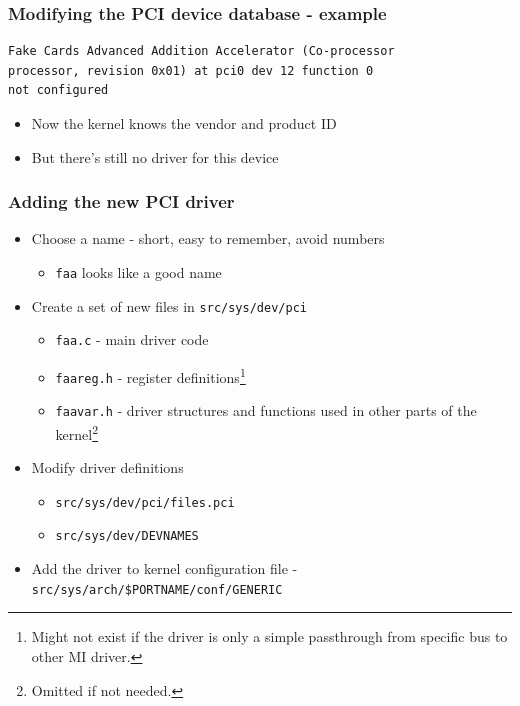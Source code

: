 \documentclass[dvipsnames,table]{beamer}
\begin{document}
\begin{frame}[fragile]
\frametitle{Modifying the PCI device database - example}
\begin{verbatim}
Fake Cards Advanced Addition Accelerator (Co-processor 
processor, revision 0x01) at pci0 dev 12 function 0 
not configured
\end{verbatim}
\begin{itemize}
	\item Now the kernel knows the vendor and product ID
	\item But there's still no driver for this device
\end{itemize}
\end{frame}

\begin{frame}
\frametitle{Adding the new PCI driver}
\begin{itemize}
	\item Choose a name - short, easy to remember, avoid numbers
	\begin{itemize}
		\item {\tt faa} looks like a good name
	\end{itemize}
	\item Create a set of new files in {\tt src/sys/dev/pci}
	\begin{itemize}
		\item {\tt faa.c} - main driver code
		\item {\tt faareg.h} - register definitions\footnote{Might not exist if the driver is only a simple passthrough from specific bus to other MI driver.}
		\item {\tt faavar.h} - driver structures and functions used in other parts of the kernel\footnote{Omitted if not needed.}
	\end{itemize}
	\item Modify driver definitions
	\begin{itemize}
		\item {\tt src/sys/dev/pci/files.pci}
		\item {\tt src/sys/dev/DEVNAMES}
	\end{itemize}
	\item Add the driver to kernel configuration file - {\tt src/sys/arch/\$PORTNAME/conf/GENERIC}
\end{itemize}
\end{frame}
\end{document}
